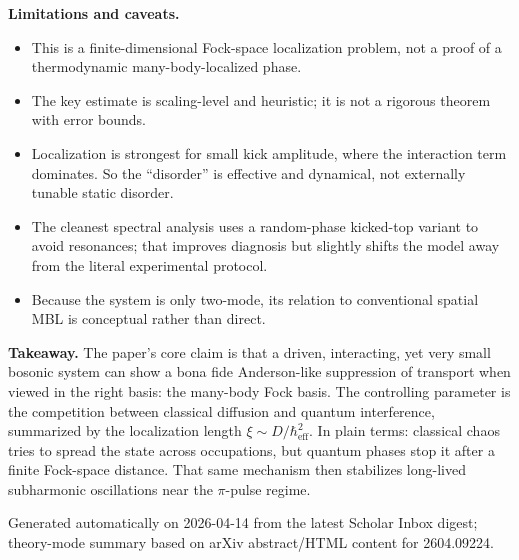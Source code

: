 \documentclass[11pt]{article}
\begin{document}
\textbf{Limitations and caveats.}
\begin{itemize}
  \item This is a finite-dimensional Fock-space localization problem, not a proof of a thermodynamic many-body-localized phase.
  \item The key estimate is scaling-level and heuristic; it is not a rigorous theorem with error bounds.
  \item Localization is strongest for small kick amplitude, where the interaction term dominates. So the ``disorder'' is effective and dynamical, not externally tunable static disorder.
  \item The cleanest spectral analysis uses a random-phase kicked-top variant to avoid resonances; that improves diagnosis but slightly shifts the model away from the literal experimental protocol.
  \item Because the system is only two-mode, its relation to conventional spatial MBL is conceptual rather than direct.
\end{itemize}

\textbf{Takeaway.} The paper's core claim is that a driven, interacting, yet very small bosonic system can show a bona fide Anderson-like suppression of transport when viewed in the right basis: the many-body Fock basis. The controlling parameter is the competition between classical diffusion and quantum interference, summarized by the localization length $\xi\sim D/\hbar_\mathrm{eff}^2$. In plain terms: classical chaos tries to spread the state across occupations, but quantum phases stop it after a finite Fock-space distance. That same mechanism then stabilizes long-lived subharmonic oscillations near the $\pi$-pulse regime.

\vfill
{\small Generated automatically on 2026-04-14 from the latest Scholar Inbox digest; theory-mode summary based on arXiv abstract/HTML content for 2604.09224.}
\end{document}
